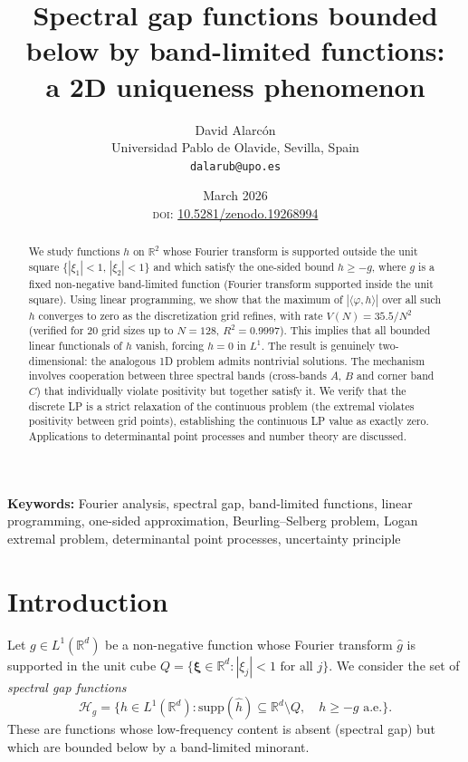 \documentclass[11pt]{article}
\title{\textbf{Spectral gap functions bounded below by band-limited functions:\\
a 2D uniqueness phenomenon}}
\author{David Alarc\'on\\
\small Universidad Pablo de Olavide, Sevilla, Spain\\
\small \texttt{dalarub@upo.es}}
\date{March 2026\\[2pt]
\small \textsc{doi}: \href{https://doi.org/10.5281/zenodo.19268994}{10.5281/zenodo.19268994}}
\begin{document}
\maketitle

\begin{abstract}
We study functions $h$ on $\mathbb{R}^2$ whose Fourier transform is
supported outside the unit square $\{|\xi_1| < 1,\, |\xi_2| < 1\}$
and which satisfy the one-sided bound $h \geq -g$, where $g$ is a
fixed non-negative band-limited function (Fourier transform supported
inside the unit square). Using linear programming, we show that the
maximum of $|\langle \varphi, h \rangle|$ over all such $h$ converges
to zero as the discretization grid refines, with rate
$V(N) = 35.5/N^2$ (verified for 20 grid sizes up to $N = 128$,
$R^2 = 0.9997$). This implies that all bounded linear functionals
of $h$ vanish, forcing $h = 0$ in $L^1$. The result is genuinely
two-dimensional: the analogous 1D problem admits nontrivial solutions.
The mechanism involves cooperation between three spectral bands
(cross-bands $A$, $B$ and corner band $C$) that individually violate
positivity but together satisfy it. We verify that the discrete LP is
a strict relaxation of the continuous problem (the extremal violates
positivity between grid points), establishing the continuous LP value
as exactly zero. Applications to determinantal point processes and
number theory are discussed.
\end{abstract}

\bigskip
\noindent\textbf{Keywords:} Fourier analysis, spectral gap, band-limited functions, linear programming, one-sided approximation, Beurling--Selberg problem, Logan extremal problem, determinantal point processes, uncertainty principle

\bigskip


\section{Introduction}

Let $g \in L^1(\mathbb{R}^d)$ be a non-negative function whose Fourier
transform $\hat{g}$ is supported in the unit cube
$Q = \{\boldsymbol{\xi} \in \mathbb{R}^d : |\xi_j| < 1 \text{ for all } j\}$.
We consider the set of \emph{spectral gap functions}
\begin{equation}
\mathcal{H}_g = \bigl\{ h \in L^1(\mathbb{R}^d) :
\mathrm{supp}(\hat{h}) \subseteq \mathbb{R}^d \setminus Q,\quad
h \geq -g \text{ a.e.} \bigr\}.
\label{eq:Hg}
\end{equation}
These are functions whose low-frequency content is absent (spectral gap)
but which are bounded below by a band-limited minorant.
\end{document}
